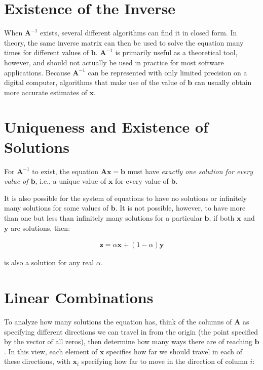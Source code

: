 \para

\section{Existence of the Inverse}

When \(\mathbf{A}^{-1}\) exists, several different algorithms can find it in closed form. In theory, the same inverse matrix can then be used to solve the equation many times for different values of \(\mathbf{b}\). \(\mathbf{A}^{-1}\) is primarily useful as a theoretical tool, however, and should not actually be used in practice for most software applications. Because \(\mathbf{A}^{-1}\) can be represented with only limited precision on a digital computer, algorithms that make use of the value of \(\mathbf{b}\) can usually obtain more accurate estimates of \(\mathbf{x}\).

\para

\section{Uniqueness and Existence of Solutions}

For \(\mathbf{A}^{-1}\) to exist, the equation \(\mathbf{A}\mathbf{x} = \mathbf{b}\) must have \textit{exactly one solution for every value of \(\mathbf{b}\)}, i.e., a unique value of \(\mathbf{x}\) for every value of \(\mathbf{b}\).

It is also possible for the system of equations to have no solutions or infinitely many solutions for some values of \(\mathbf{b}\). It is not possible, however, to have more than one but less than infinitely many solutions for a particular \(\mathbf{b}\); if both \(\mathbf{x}\) and \(\mathbf{y}\) are solutions, then:

\begin{align}
\mathbf{z} = \alpha\mathbf{x} + (1 - \alpha)\mathbf{y}
\end{align}

is also a solution for any real \(\alpha\).

\clearpage
\newpage

\section{Linear Combinations}

To analyze how many solutions the equation has, think of the columns of \(\mathbf{A}\) as specifying different directions we can travel in from the origin (the point specified by the vector of all zeros), then determine how many ways there are of reaching \(\mathbf{b}\). In this view, each element of \(\mathbf{x}\) specifies how far we should travel in each of these directions, with \(\mathbf{x}_{i}\) specifying how far to move in the direction of column \(i\):


